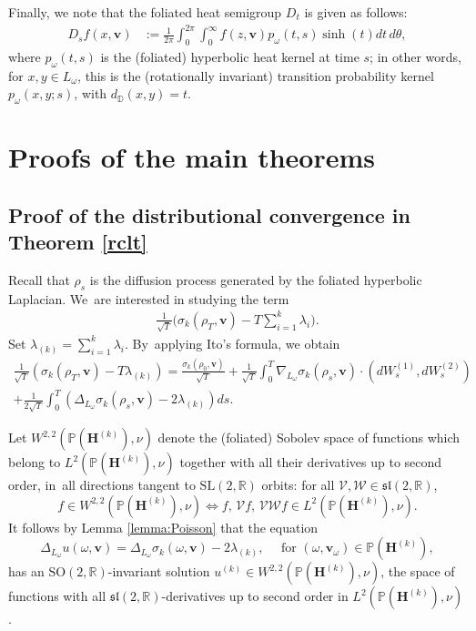 \documentclass[10pt]{amsart}
\theoremstyle{plain}
\theoremstyle{definition}
\numberwithin{equation}{subsection}
\newcommand\bD{\mathbb{D}}
\newcommand\bP{\mathbb{P}}
\newcommand\bR{\mathbb{R}}\let\R\bR
\newcommand\cV{\mathcal{V}}
\newcommand\cW{\mathcal{W}}
\newcommand{\SL}{\mathrm{SL}}
\newcommand{\SO}{\mathrm{SO}}
\let\gradient\nabla
\let\laplacian\Delta
\newcommand{\bfH}{\boldsymbol{H}}
\newcommand{\bfv}{\boldsymbol{v}}
\newcommand{\defeq}{:=}
\begin{document}
Finally, we note that the foliated heat semigroup $D_t$ is given as follows:\vspace*{-3pt}
\begin{align*}
D_s f(x,\bfv)&\defeq \frac{1}{2\pi}\int_0^{2\pi} \int_0^\infty f(z,\bfv) p_{\omega}(t,s) \sinh(t) d t\, d\theta,
\end{align*}
where $p_{\omega}(t,s)$ is the (foliated) hyperbolic heat kernel at time $s$; in other words, for $x,y \in L_\omega$, this is the (rotationally invariant) transition probability kernel $p_{\omega} (x,y;s)$, with $d_{\bD}(x,y) = t$.

\section{Proofs of the main theorems}
\subsection{Proof of the distributional convergence in Theorem \ref{rclt}}\label{randomproof} Recall that $\rho_s$ is the diffusion process generated by the foliated hyperbolic Laplacian. We~are interested in studying the term\vspace*{-5pt}
\begin{align*}\frac{1}{\sqrt{T}} \bigl(\sigma_k(\rho_T,\bfv) - T\textstyle\sum_{i=1}^k\lambda_i\bigr).
\end{align*}
Set $\lambda_{(k)} = \sum_{i=1}^k \lambda_i$. By~applying Ito's formula, we obtain\vspace*{-5pt}
\begin{multline*}
\frac{1}{\sqrt{T}} (\sigma_k(\rho_T,\bfv) - T\lambda_{(k)}) = \frac{\sigma_k(\rho_0,\bfv)}{\sqrt{T}} +\frac{1}{\sqrt{T}}\int_0^T \gradient_{L_\omega}\sigma_k(\rho_s,\bfv) \cdot (dW^{(1)}_s,dW^{(2)}_s) \\[-5pt]
+ \frac{1}{2\sqrt{T}}\int_0^T (\laplacian_{L_\omega} \sigma_k(\rho_s,\bfv)-2\lambda_{(k)})ds.
\end{multline*}

Let $W^{2,2}(\bP(\bfH^{(k)}), \nu)$ denote the (foliated) Sobolev space of functions which belong to $L^2(\bP(\bfH^{(k)}), \nu)$ together with all their derivatives up to second order, in~all \hbox{directions} tangent to $\SL(2, \R)$ orbits: for all $\cV, \cW \in \mathfrak{sl}(2, \R)$,
\[
f \in W^{2,2}(\bP(\bfH^{(k)}), \nu) \iff f, \,\cV f, \, \cV \cW f \in L^2(\bP(\bfH^{(k)}), \nu).
\]
It follows by Lemma \ref{lemma:Poisson} that the equation\vspace*{-3pt}
\begin{equation}
\label{poissoneq}
\laplacian_{L_\omega} u(\omega,\bfv) = \laplacian_{L_\omega} \sigma_k(\omega,\bfv) - 2\lambda_{(k)}, \quad \text{ for } (\omega,\bfv_\omega)\in \bP(\bfH^{(k)}),
\end{equation}
has an $\SO(2,\bR)$-invariant solution $u^{(k)} \!\in\! W^{2,2}(\bP(\bfH^{(k)}), \nu)$, the space of functions with all $\mathfrak{sl}(2, \R)$-derivatives up to second order in $L^2(\bP(\bfH^{(k)}),\nu)$.
\end{document}
